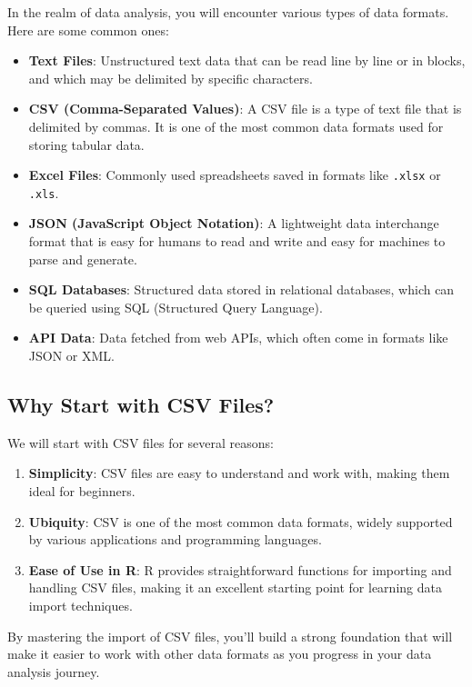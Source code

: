 \documentclass[
]{book}
\providecommand{\tightlist}{%
  \setlength{\itemsep}{0pt}\setlength{\parskip}{0pt}}
\begin{document}
In the realm of data analysis, you will encounter various types of data formats. Here are some common ones:

\begin{itemize}
\tightlist
\item
  \textbf{Text Files}: Unstructured text data that can be read line by line or in blocks, and which may be delimited by specific characters.
\item
  \textbf{CSV (Comma-Separated Values)}: A CSV file is a type of text file that is delimited by commas. It is one of the most common data formats used for storing tabular data.
\item
  \textbf{Excel Files}: Commonly used spreadsheets saved in formats like \texttt{.xlsx} or \texttt{.xls}.
\item
  \textbf{JSON (JavaScript Object Notation)}: A lightweight data interchange format that is easy for humans to read and write and easy for machines to parse and generate.
\item
  \textbf{SQL Databases}: Structured data stored in relational databases, which can be queried using SQL (Structured Query Language).
\item
  \textbf{API Data}: Data fetched from web APIs, which often come in formats like JSON or XML.
\end{itemize}

\hypertarget{why-start-with-csv-files}{%
\subsection{Why Start with CSV Files?}\label{why-start-with-csv-files}}

We will start with CSV files for several reasons:

\begin{enumerate}
\def\labelenumi{\arabic{enumi}.}
\tightlist
\item
  \textbf{Simplicity}: CSV files are easy to understand and work with, making them ideal for beginners.
\item
  \textbf{Ubiquity}: CSV is one of the most common data formats, widely supported by various applications and programming languages.
\item
  \textbf{Ease of Use in R}: R provides straightforward functions for importing and handling CSV files, making it an excellent starting point for learning data import techniques.
\end{enumerate}

By mastering the import of CSV files, you'll build a strong foundation that will make it easier to work with other data formats as you progress in your data analysis journey.
\end{document}
